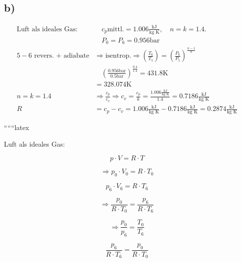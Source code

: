 

\subsection*{b)}

\begin{align*}
    \text{Luft als ideales Gas:} & \quad c_p \text{mittl.} = 1.006 \frac{\text{kJ}}{\text{kg K}}, \quad n = k = 1.4. \\
    & \quad P_0 = P_6 = 0.956 \text{bar} \\
    5-6 \text{ revers. + adiabate} & \Rightarrow \text{isentrop.} \Rightarrow \left( \frac{T_6}{T_5} \right) = \left( \frac{P_6}{P_5} \right)^{\frac{n-1}{n}} \\
    & \quad \left( \frac{0.956 \text{bar}}{0.5 \text{bar}} \right)^{\frac{0.4}{1.4}} = 431.8 \text{K} \\
    & = 328.074 \text{K} \\
    n = k = 1.4 & \Rightarrow \frac{c_p}{c_v} \Rightarrow c_v = \frac{c_p}{k} = \frac{1.006 \frac{\text{kJ}}{\text{kg K}}}{1.4} = 0.7186 \frac{\text{kJ}}{\text{kg K}} \\
    R & = c_p - c_v = 1.006 \frac{\text{kJ}}{\text{kg K}} - 0.7186 \frac{\text{kJ}}{\text{kg K}} = 0.2874 \frac{\text{kJ}}{\text{kg K}}
\end{align*}

``````latex


Luft als ideales Gas:

\begin{equation}
p \cdot V = R \cdot T
\end{equation}

\begin{equation}
\Rightarrow p_0 \cdot V_0 = R \cdot T_0
\end{equation}

\begin{equation}
p_6 \cdot V_6 = R \cdot T_6
\end{equation}

\begin{equation}
\Rightarrow \frac{p_0}{R \cdot T_0} = \frac{p_6}{R \cdot T_6}
\end{equation}

\begin{equation}
\Rightarrow \frac{p_0}{p_6} = \frac{T_0}{T_6}
\end{equation}

\begin{equation}
\frac{p_6}{R \cdot T_6} = \frac{p_0}{R \cdot T_0}
\end{equation}

